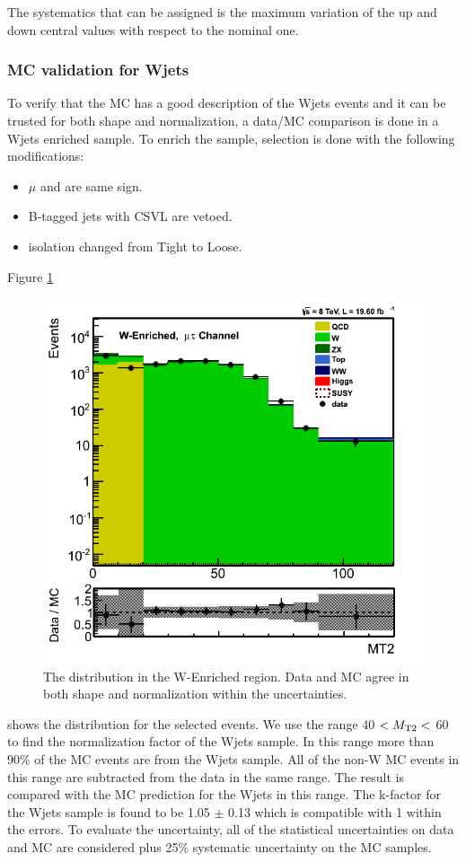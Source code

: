 The systematics that can be assigned is the maximum variation of the up and down central values with 
respect to the nominal one. 

\subsubsection{MC validation for Wjets}
To verify that the MC has a good description of the Wjets events and it can be trusted for both shape and normalization, a data/MC comparison 
is done in a Wjets enriched sample. To enrich the sample, \muTau selection is done with the following modifications:
\begin{itemize}
\item $\mu$ and \Tau are same sign.
\item B-tagged jets with CSVL are vetoed.
\item \Tau isolation changed from Tight to Loose.
\end{itemize}
Figure \ref{fig:mt2_WValidation} 
\begin{figure}[!Hhtb]
\centering
\includegraphics[angle=0,scale=0.35]{TauTauFigs/MT2_WValidation.png}
\caption{The \mttwo distribution in the W-Enriched region. Data and MC agree in both shape and normalization within the uncertainties.}
\label{fig:mt2_WValidation}
\end{figure}
shows the \mttwo distribution for the selected events. We use the range 40 $<{M_{\rm T2}}<$ 60 \GeV to find the normalization factor of the 
Wjets sample. In this range more than 90\% of the MC events are from the Wjets sample. 
All of the non-W MC events in this range are subtracted from 
the data in the same range. The result is compared with the MC prediction for the Wjets in this range. The k-factor for the Wjets sample is 
found to be 1.05 $\pm$ 0.13 which is compatible with 1 within the errors. To evaluate the uncertainty, 
all of the statistical uncertainties on data and MC are considered plus 25\% systematic uncertainty on the MC samples.

